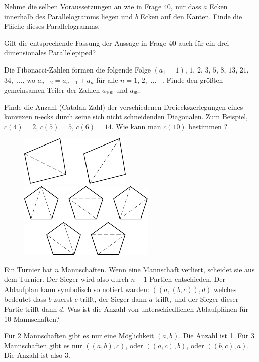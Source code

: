 \documentclass[12pt]{article} %
\begin{document}
\medskip
{} Nehme die selben Voraussetzungen an wie in Frage 40, nur dass $a$ Ecken innerhalb des Parallelogramms liegen und $b$ Ecken auf den Kanten. Finde die Fläche dieses Parallelogramms.

\bigskip
{} Gilt die entsprechende Fassung der Aussage in Frage 40 auch für ein drei dimensionales Parallelepiped?

\bigskip
{} Die Fibonacci-Zahlen formen die folgende Folge $(a_1=1)$, $1$, $2$, $3$, $5$, $8$, $13$, $21$,
$34$,\nobreak\ $\dots$, wo $a_{n+2}=a_{n+1}+a_n$ für alle
$n=1$, $2$,\nobreak\ $\dots$ \ . Finde den größten gemeinsamen Teiler der Zahlen $a_{100}$ und $a_{99}$.

\newpage
{} Finde die Anzahl (Catalan-Zahl) der verschiedenen Dreieckszerlegungen eines konvexen n-ecks durch seine sich nicht schneidenden Diagonalen.
Zum Beispiel, $c(4)=2$, $c(5)=5$, $c(6)=14$. Wie kann man $c(10)$ bestimmen ?

\begin{figure}[h]
\centering
\includegraphics[scale=1]{taskbook-281}
\hskip1cm\includegraphics[scale=1]{taskbook-282}
\end{figure}


{} Ein Turnier hat $n$ Mannschaften. Wenn eine Mannschaft verliert, scheidet sie aus dem Turnier. Der Sieger wird also durch $n-1$ Partien entschieden. 
Der Ablaufplan kann symbolisch so notiert warden: $((a,(b,c)),d)$ welches bedeutet dass $b$ zuerst $c$ trifft, der Sieger dann $a$ trifft, und der Sieger dieser Partie trifft dann $d$. 
Was ist die Anzahl von unterschiedlichen Ablaufplänen für 10 Mannschaften?

Für 2 Mannschaften gibt es nur eine Möglichkeit $(a,b)$. Die Anzahl ist 1.
Für 3 Mannschaften gibt es nur $((a,b),c)$, oder $((a,c),b)$, oder $((b,c),a)$. Die Anzahl ist also 3.
\end{document}
